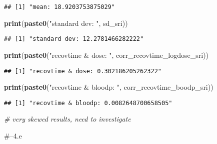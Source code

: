 \documentclass[
]{article}
\newenvironment{Shaded}{\begin{snugshade}}{\end{snugshade}}
\newcommand{\CommentTok}[1]{\textcolor[rgb]{0.56,0.35,0.01}{\textit{#1}}}
\newcommand{\DataTypeTok}[1]{\textcolor[rgb]{0.13,0.29,0.53}{#1}}
\newcommand{\KeywordTok}[1]{\textcolor[rgb]{0.13,0.29,0.53}{\textbf{#1}}}
\newcommand{\NormalTok}[1]{#1}
\newcommand{\OperatorTok}[1]{\textcolor[rgb]{0.81,0.36,0.00}{\textbf{#1}}}
\newcommand{\OtherTok}[1]{\textcolor[rgb]{0.56,0.35,0.01}{#1}}
\newcommand{\StringTok}[1]{\textcolor[rgb]{0.31,0.60,0.02}{#1}}
\begin{document}
\begin{verbatim}
## [1] "mean: 18.9203753875029"
\end{verbatim}

\begin{Shaded}
\begin{Highlighting}[]
\KeywordTok{print}\NormalTok{(}\KeywordTok{paste0}\NormalTok{(}\StringTok{"standard dev: "}\NormalTok{, sd_sri))}
\end{Highlighting}
\end{Shaded}

\begin{verbatim}
## [1] "standard dev: 12.2781466282222"
\end{verbatim}

\begin{Shaded}
\begin{Highlighting}[]
\KeywordTok{print}\NormalTok{(}\KeywordTok{paste0}\NormalTok{(}\StringTok{"recovtime & dose: "}\NormalTok{, corr_recovtime_logdose_sri))}
\end{Highlighting}
\end{Shaded}

\begin{verbatim}
## [1] "recovtime & dose: 0.302186205262322"
\end{verbatim}

\begin{Shaded}
\begin{Highlighting}[]
\KeywordTok{print}\NormalTok{(}\KeywordTok{paste0}\NormalTok{(}\StringTok{"recovtime & bloodp: "}\NormalTok{, corr_recovtime_boodp_sri))}
\end{Highlighting}
\end{Shaded}

\begin{verbatim}
## [1] "recovtime & bloodp: 0.0082648700658505"
\end{verbatim}

\begin{Shaded}
\begin{Highlighting}[]
\CommentTok{# very skewed results, need to investigate}
\end{Highlighting}
\end{Shaded}

\#--4.e

\begin{Shaded}
\end{Shaded}
\end{document}

